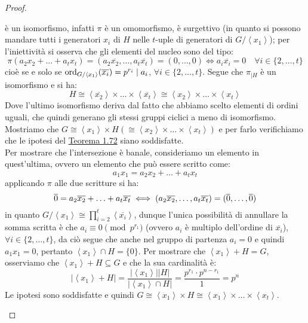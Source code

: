 \documentclass[11pt]{scrartcl}
\begin{document}
\begin{proof}
\begin{itemize}
\[                    \]
            è un isomorfismo, infatti $\pi$ è un omomorfismo, è surgettivo (in quanto si possono mandare tutti i generatori $x_i$ di $H$ nelle $t$-uple di generatori di $G/\left<x_1\right>$); per l'iniettività si osserva che gli elementi del nucleo sono del tipo:
                \[ \pi(a_2x_2 + \ldots + a_tx_t) = (a_2\overline{x_2}, \ldots, a_t\overline{x_t}) = (0,\ldots,0) \iff a_i\overline{x_i} = 0 \quad \forall i \in\{2,\ldots,t\}
                    \]
            cioè se e solo se $\operatorname{ord}_{G/\left<x_1\right>}(\overline{x_i}) = p^{r_i} \mid a_i$, $\forall i \in \{2,\ldots,t\}$. Segue che $\pi_{\mid H}$ è un isomorfismo e si ha:
                \[ H \cong \left<\overline{x_2}\right> \times \ldots \times \left<\overline{x_t}\right> \cong \left<{x_2}\right> \times \ldots \times \left<{x_t}\right>
                    \]
            Dove l'ultimo isomorfismo deriva dal fatto che abbiamo scelto elementi di ordini uguali, che quindi generano gli stessi gruppi ciclici a meno di isomorfismo.
            Mostriamo che $G \cong \left<x_1\right> \times H (\cong \left<x_2\right> \times \ldots \times \left<x_t\right>)$ e per farlo verifichiamo che le ipotesi del \hyperref[t:1.72]{Teorema 1.72} siano soddisfatte. \\
            Per mostrare che l'intersezione è banale, consideriamo un elemento in quest'ultima, ovvero un elemento che può essere scritto come:
                \[ a_1x_1 = a_2x_2 + \ldots + a_tx_t
                    \]
            applicando $\pi$ alle due scritture si ha:
                \[ \overline 0 =  a_2\overline{x_2} + \ldots + a_t\overline{x_t} \iff (a_2\overline{x_2}, \ldots, a_t\overline{x_t}) = (\overline 0,\ldots, \overline 0)
                    \]
            in quanto $G/\left<x_1\right> \cong \prod_{i= 2}^{t}\left<\overline{x_i}\right>$, dunque l'unica possibilità di annullare la somma scritta è che $a_i \equiv 0 \pmod{p^{r_1}}$ (ovvero $a_i$ è multiplo dell'ordine di $\overline{x_i}$), $\forall i \in \{2,\ldots,t\}$, da ciò segue che
            anche nel gruppo di partenza $a_i = 0$ e quindi $a_1x_1 = 0$, pertanto $\left<x_1\right> \cap H = \{0\}$.
            Per mostrare che $\left<x_1\right> + H = G$, osserviamo che $\left<x_1\right> + H \subseteq G$ e che la sua cardinalità è:
                \[ |\left<x_1\right> + H| = \frac{|\left<x_1\right>||H|}{|\left<x_1\right> \cap H|} = \frac{p^{r_1}\cdot p^{n - r_1}}{1} = p^n
                    \]
            Le ipotesi sono soddisfatte e quindi $G \cong \left<x_1\right> \times H \cong \left<x_1\right> \times \ldots \times \left<x_t\right>$.

\end{itemize}
\end{proof}
\end{document}
